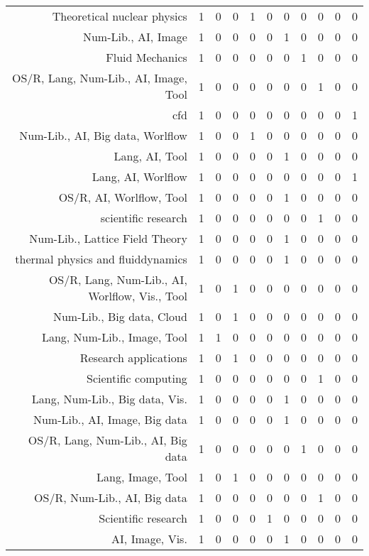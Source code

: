 {\begin{landscape}
\begin{longtable}[htb]{r|c|c|c|c|c|c|c|c|c|c}
{Theoretical nuclear physics} & 1 & 0 & 0 & 1 & 0 & 0 & 0 & 0 & 0 & 0 \\%
{Num-Lib., AI, Image} & 1 & 0 & 0 & 0 & 0 & 1 & 0 & 0 & 0 & 0 \\%
{Fluid Mechanics} & 1 & 0 & 0 & 0 & 0 & 0 & 1 & 0 & 0 & 0 \\%
{OS/R, Lang, Num-Lib., AI, Image, Tool} & 1 & 0 & 0 & 0 & 0 & 0 & 0 & 1 & 0 & 0 \\%
{cfd} & 1 & 0 & 0 & 0 & 0 & 0 & 0 & 0 & 0 & 1 \\%
{Num-Lib., AI, Big data, Worlflow} & 1 & 0 & 0 & 1 & 0 & 0 & 0 & 0 & 0 & 0 \\%
{Lang, AI, Tool} & 1 & 0 & 0 & 0 & 0 & 1 & 0 & 0 & 0 & 0 \\%
{Lang, AI, Worlflow} & 1 & 0 & 0 & 0 & 0 & 0 & 0 & 0 & 0 & 1 \\%
{OS/R, AI, Worlflow, Tool} & 1 & 0 & 0 & 0 & 0 & 1 & 0 & 0 & 0 & 0 \\%
{scientific research} & 1 & 0 & 0 & 0 & 0 & 0 & 0 & 1 & 0 & 0 \\%
{Num-Lib., Lattice Field Theory} & 1 & 0 & 0 & 0 & 0 & 1 & 0 & 0 & 0 & 0 \\%
{thermal physics and fluiddynamics} & 1 & 0 & 0 & 0 & 0 & 1 & 0 & 0 & 0 & 0 \\%
{OS/R, Lang, Num-Lib., AI, Worlflow, Vis., Tool} & 1 & 0 & 1 & 0 & 0 & 0 & 0 & 0 & 0 & 0 \\%
{Num-Lib., Big data, Cloud} & 1 & 0 & 1 & 0 & 0 & 0 & 0 & 0 & 0 & 0 \\%
{Lang, Num-Lib., Image, Tool} & 1 & 1 & 0 & 0 & 0 & 0 & 0 & 0 & 0 & 0 \\%
{Research applications} & 1 & 0 & 1 & 0 & 0 & 0 & 0 & 0 & 0 & 0 \\%
{Scientific computing} & 1 & 0 & 0 & 0 & 0 & 0 & 0 & 1 & 0 & 0 \\%
{Lang, Num-Lib., Big data, Vis.} & 1 & 0 & 0 & 0 & 0 & 1 & 0 & 0 & 0 & 0 \\%
{Num-Lib., AI, Image, Big data} & 1 & 0 & 0 & 0 & 0 & 1 & 0 & 0 & 0 & 0 \\%
{OS/R, Lang, Num-Lib., AI, Big data} & 1 & 0 & 0 & 0 & 0 & 0 & 1 & 0 & 0 & 0 \\%
{Lang, Image, Tool} & 1 & 0 & 1 & 0 & 0 & 0 & 0 & 0 & 0 & 0 \\%
{OS/R, Num-Lib., AI, Big data} & 1 & 0 & 0 & 0 & 0 & 0 & 0 & 1 & 0 & 0 \\%
{Scientific research} & 1 & 0 & 0 & 0 & 1 & 0 & 0 & 0 & 0 & 0 \\%
{AI, Image, Vis.} & 1 & 0 & 0 & 0 & 0 & 1 & 0 & 0 & 0 & 0 \\%

\end{longtable}
\end{landscape}}
